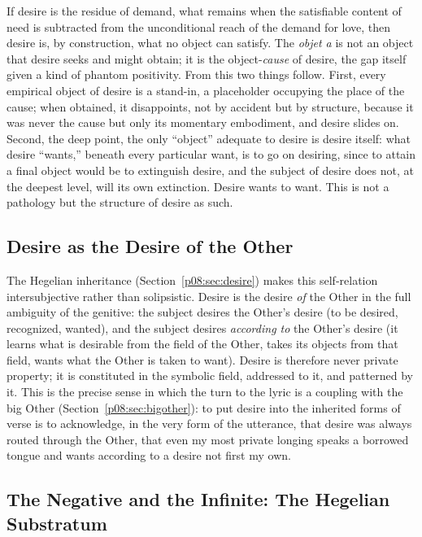 If desire is the residue of demand, what remains when the satisfiable content of need is subtracted from the unconditional reach of the demand for love, then desire is, by construction, what no object can satisfy. The \textit{objet a} is not an object that desire seeks and might obtain; it is the object-\emph{cause} of desire, the gap itself given a kind of phantom positivity. From this two things follow. First, every empirical object of desire is a stand-in, a placeholder occupying the place of the cause; when obtained, it disappoints, not by accident but by structure, because it was never the cause but only its momentary embodiment, and desire slides on. Second, the deep point, the only ``object'' adequate to desire is desire itself: what desire ``wants,'' beneath every particular want, is to go on desiring, since to attain a final object would be to extinguish desire, and the subject of desire does not, at the deepest level, will its own extinction. Desire wants to want. This is not a pathology but the structure of desire as such.

\subsection{Desire as the Desire of the Other}

The Hegelian inheritance (Section~\ref{p08:sec:desire}) makes this self-relation intersubjective rather than solipsistic. Desire is the desire \emph{of} the Other in the full ambiguity of the genitive: the subject desires the Other's desire (to be desired, recognized, wanted), and the subject desires \emph{according to} the Other's desire (it learns what is desirable from the field of the Other, takes its objects from that field, wants what the Other is taken to want). Desire is therefore never private property; it is constituted in the symbolic field, addressed to it, and patterned by it. This is the precise sense in which the turn to the lyric is a coupling with the big Other (Section~\ref{p08:sec:bigother}): to put desire into the inherited forms of verse is to acknowledge, in the very form of the utterance, that desire was always routed through the Other, that even my most private longing speaks a borrowed tongue and wants according to a desire not first my own.

\subsection{The Negative and the Infinite: The Hegelian Substratum}

